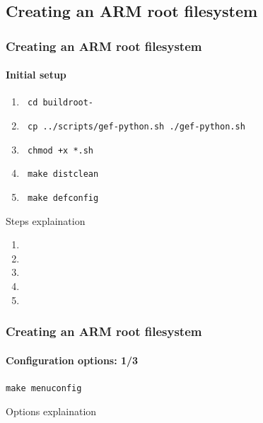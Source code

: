 \subsection{Creating an ARM root filesystem}
 {
  \begin{frame}
    \frametitle{Creating an ARM root filesystem}
    \framesubtitle{Initial setup}

    \begin{enumerate}
      \item \texttt{ cd buildroot-\buildrootLatestVersion }
      \item \texttt{ cp ../scripts/gef-python.sh ./gef-python.sh }
      \item \texttt{ chmod +x *.sh }
      \item \texttt{ make distclean }
      \item \texttt{ make defconfig }
    \end{enumerate}

  \end{frame}
   {
    Steps explaination
    \begin{enumerate}
      \item \enteringBuildRootDirectoryDescription
      \item \gefPythonDescription
      \item \scriptShouldBeExecutableDescription
      \item \makeCleanDescription
      \item \makeDefConfigDescription
    \end{enumerate}
  }

  \begin{frame}
    \frametitle{Creating an ARM root filesystem}
    \framesubtitle{Configuration options: 1/3}
    \texttt{make menuconfig}
    \begin{itemize}
      \targetOptionsList
      \buildOptionsList
    \end{itemize}
  \end{frame}
   {
    Options explaination \\
    \targetOptionsDescription \\
    \buildOptionsDescription
  }

}
